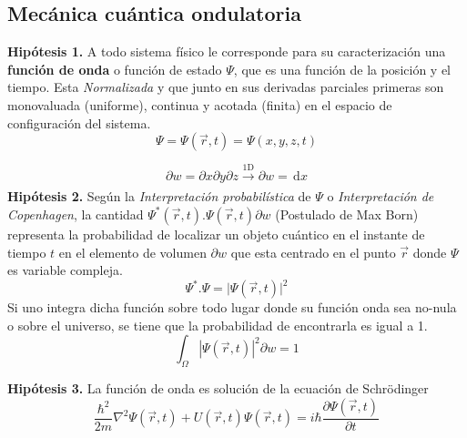 \documentclass[10pt,twocolumn,titlepage]{article}
\newcommand{\di}{\,\textrm{d}}
\begin{document}


\subsection{Mecánica cuántica ondulatoria}

\textbf{Hipótesis 1.} A todo sistema físico le corresponde para su caracterización una \textbf{función de onda} o función de estado $\Psi$, que es una función de la posición y el tiempo. Esta \emph{Normalizada} y que junto en sus derivadas parciales primeras son monovaluada (uniforme), continua y acotada (finita) en el espacio de configuración del sistema.
$$ \Psi =\Psi (\vec{r},t)=\Psi (x,y,z,t) $$

$$\partial w=\partial x \partial y \partial z\xrightarrow[]{\text{1D}} \partial w= \di x$$
\textbf{Hipótesis 2.} Según la \emph{Interpretación probabilística} de $\Psi$ o \emph{Interpretación de Copenhagen}, la cantidad $\Psi^{*}(\vec{r},t).\Psi(\vec{r},t)\partial w$ (Postulado de Max Born) representa la probabilidad de localizar un objeto cuántico en el instante de tiempo $t$ en el elemento de volumen $\partial w$ que esta centrado en el punto $\vec{r}$ donde $\Psi$ es variable compleja.
$$\Psi^{*}.\Psi = \big| \Psi(\vec{r},t)\big|^2 $$
Si uno integra dicha función sobre todo lugar donde su función onda sea no-nula o sobre el universo, se tiene que la probabilidad de encontrarla es igual a 1. 
$$ \int_\Omega |\Psi(\vec{r},t)|^2\partial w =1$$

\textbf{Hipótesis 3.} La función de onda es solución de la ecuación de Schrödinger
\begin{equation} \label{schrod}
\frac{\hbar^2 }{2m} \nabla^2 \Psi(\vec{r},t)+U(\vec{r},t)\Psi(\vec{r},t)=i\hbar \frac{\partial \Psi(\vec{r},t)}{\partial t} 
\end{equation}
\end{document}
